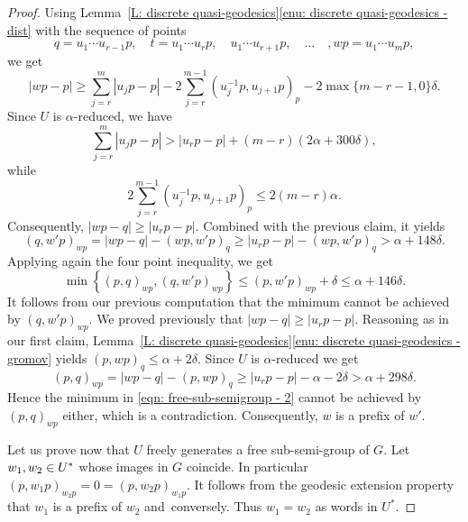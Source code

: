 \begin{proof}
Using Lemma~\ref{L: discrete quasi-geodesics}\eqref{enu: discrete quasi-geodesics - dist} with the sequence of points
\begin{equation*}
q = u_1\cdots u_{r-1}p, \quad t = u_1\cdots u_rp, \quad u_1\cdots u_{r+1}p, \quad\dots\quad, wp = u_1\cdots u_mp,
\end{equation*}
we get
\begin{equation*}
|wp -p| \geq \sum_{j = r}^m |u_jp - p| - 2 \sum_{j = r}^{m-1} (u_j^{-1}p,u_{j+1}p)_p - 2\max\{m-r-1,0\}\delta.
\end{equation*}
Since $U$ is $\alpha$-reduced, we have
\begin{equation*}
\sum_{j = r}^m |u_jp - p| > |u_rp - p| + (m-r)(2\alpha + 300\delta),
\end{equation*}
while
\begin{equation*}
2 \sum_{j = r}^{m-1} (u_j^{-1}p,u_{j+1}p)_p \leq 2(m-r)\alpha.
\end{equation*}
Consequently, $|wp - q| \geq |u_rp - p|$.
Combined with the previous claim, it yields
\begin{equation*}
(q, w'p)_{wp} = |wp - q| - (wp,w'p)_q \geq |u_rp - p| - (wp,w'p)_q > \alpha +148\delta.
\end{equation*}
Applying again the four point inequality, we get
\begin{equation}
\label{eqn: free-sub-semigroup - 2}
\min \left\{(p,q)_{wp}, (q, w'p)_{wp}\right\} \leq (p,w'p)_{wp} + \delta \leq \alpha + 146\delta.
\end{equation}
It follows from our previous computation that the minimum cannot be achieved by $(q,w'p)_{wp}$.
We proved previously that $|wp - q| \geq |u_rp - p|$.
Reasoning as in our first claim, Lemma~\ref{L: discrete quasi-geodesics}\eqref{enu: discrete quasi-geodesics - gromov} yields $(p,wp)_q \leq \alpha + 2\delta$.
Since $U$ is $\alpha$-reduced we get
\begin{equation*}
(p,q)_{wp} = |wp-q| - (p,wp)_q \geq |u_rp - p| - \alpha - 2\delta > \alpha+298\delta.
\end{equation*}
Hence the minimum in \eqref{eqn: free-sub-semigroup - 2} cannot be achieved by $(p,q)_{wp}$ either, which is a contradiction.
Consequently, $w$ is a prefix of $w'$.

Let us prove now that $U$ freely generates a free sub-semi-group of $G$.
Let $w_1, w_2 \in\nobreak U^*$ whose images in $G$ coincide.
In particular $(p, w_1p)_{w_2p} = 0 = (p,w_2p)_{w_1p}$.
It follows from the geodesic extension property that $w_1$ is a prefix of $w_2$ and~conversely.
Thus $w_1 = w_2$ as words in $U^*$.
\end{proof}

